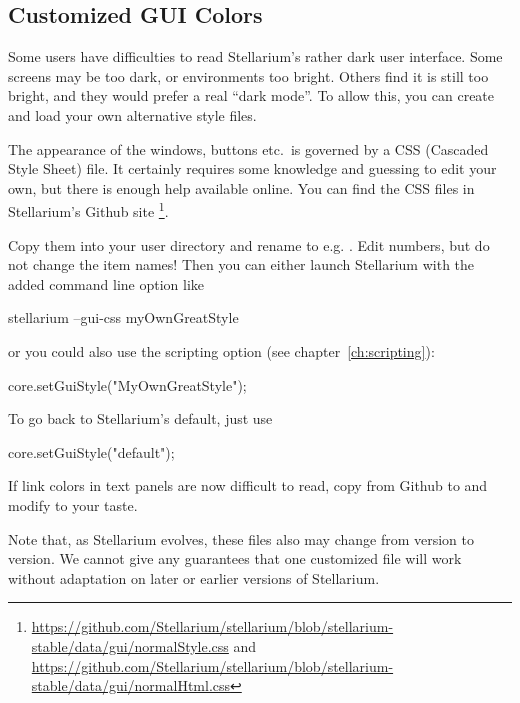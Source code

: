 \subsection{Customized GUI Colors}
\label{sec:CommandLineOptions:Special:CSS}

Some users have difficulties to read Stellarium's rather dark user
interface. Some screens may be too dark, or environments too
bright. Others find it is still too bright, and they would prefer a
real ``dark mode''. To allow this, you can create and load your own alternative style files.

The appearance of the windows, buttons etc.\ is governed by a CSS
(Cascaded Style Sheet) file. It certainly requires some knowledge and
guessing to edit your own, but there is enough help available
online. You can find the CSS files in Stellarium's Github site%
\footnote{\url{https://github.com/Stellarium/stellarium/blob/stellarium-stable/data/gui/normalStyle.css} and
  \url{https://github.com/Stellarium/stellarium/blob/stellarium-stable/data/gui/normalHtml.css}}.


Copy them into your user directory
and rename to e.g. . Edit numbers, but do
not change the item names! Then you can either launch Stellarium with
the added command line option like
\begin{commands}
  stellarium --gui-css myOwnGreatStyle
\end{commands}
or you could also use the scripting option (see chapter~\ref{ch:scripting}):
\begin{script}
  core.setGuiStyle("MyOwnGreatStyle");
\end{script}
To go back to Stellarium's default, just use
\begin{script}
  core.setGuiStyle("default");
\end{script}

If link colors in text panels are now difficult to read, copy
 from Github to
 and modify to your taste.

Note that, as Stellarium evolves, these files also may change from
version to version. We cannot give any guarantees that one customized
file will work without adaptation on later or earlier versions of Stellarium.


